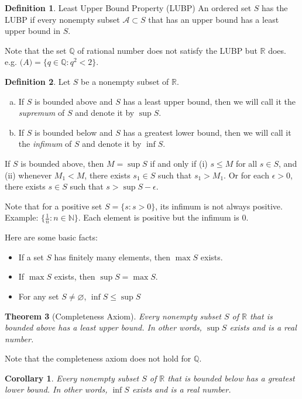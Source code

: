 \documentclass[12pt, lettersize]{book}
\theoremstyle{plain}
\newtheorem{thm}{Theorem}[section]
\newtheorem{cor}{Corollary}[thm]
\theoremstyle{definition}
\newtheorem{dfn}[thm]{Definition}
\theoremstyle{remark}
\newcommand{\R}{\mathbb{R}}
\newcommand{\N}{\mathbb{N}}
\newcommand{\Q}{\mathbb{Q}}
\let\emptyset\varnothing
\begin{document}
	\begin{dfn}
		Least Upper Bound Property (LUBP)\newline
		An ordered set $S$ has the LUBP if every nonempty subset $\mathcal{A}\subset S$ that has an upper bound has a least upper bound in $S$.
	\end{dfn}
	Note that the set $\Q$ of rational number does not satisfy the LUBP but $\R$ does. e.g. $\mathcal(A)=\{q\in\Q: q^2<2\}$.
	
	\begin{dfn}\label{def:4.3}
		Let $S$ be a nonempty subset of $\R$.
		\begin{enumerate}[(a)]
			\item If $S$ is bounded above and $S$ has a least upper bound, then we will call it the \emph{supremum} of $S$ and denote it by $\sup S$.
			\item If $S$ is bounded below and $S$ has a greatest lower bound, then we will call it the \emph{infimum} of $S$ and denote it by $\inf S$.
		\end{enumerate}
	\end{dfn}
	If $S$ is bounded above, then $M=\sup S$ if and only if (i) $s\leq M$ for all $s\in S$, and (ii) whenever $M_1<M$, there exists $s_1\in S$ such that $s_1>M_1$. Or for each $\epsilon>0$, there exists $s\in S$ such that $s>\sup S-\epsilon$.
	
	Note that for a positive set $S=\{s: s>0\}$, its infimum is not always positive. Example: $\{\frac{1}{n}: n\in\N\}$. Each element is positive but the infimum is $0$.
	
	Here are some basic facts:
	\begin{itemize}
		\item If a set $S$ has finitely many elements, then $\max S$ exists.
		\item If $\max S$ exists, then $\sup S=\max S$.
		\item For any set $S\neq\emptyset$, $\inf S\leq \sup S$
	\end{itemize}
	
	\begin{thm}[Completeness Axiom]\label{thm:4.4}
		Every nonempty subset $S$ of $\R$ that is bounded above has a least upper bound. In other words, $\sup S$ exists and is a real number.
	\end{thm}
	Note that the completeness axiom does not hold for $\Q$. 
	\begin{cor}
		Every nonempty subset $S$ of $\R$ that is bounded below has a greatest lower bound. In other words, $\inf S$ exists and is a real number.
	\end{cor}
	
\end{document}
